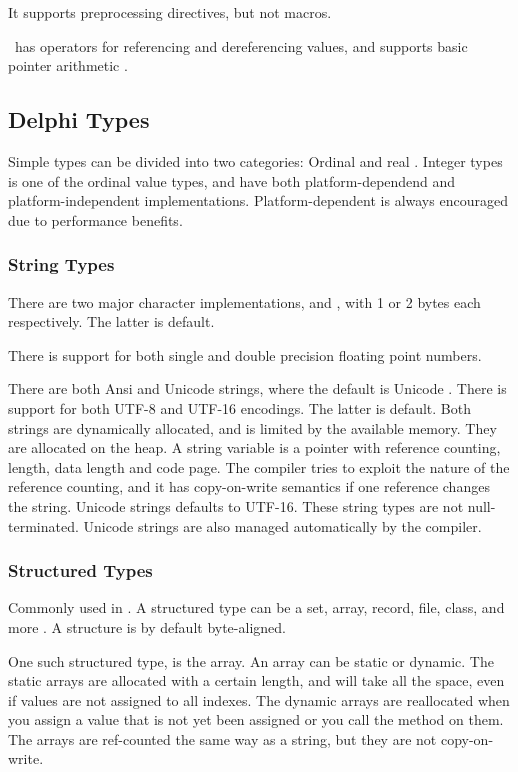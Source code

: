 It supports preprocessing directives, but not macros.

\delphi~has operators for referencing and dereferencing values, and supports basic pointer arithmetic \cite{noauthor_undated-cn}.

\subsection{Delphi Types}
\label{sub:Delphi Types}

Simple types can be divided into two categories: Ordinal and real \cite{noauthor_undated-st}. Integer types is one of the ordinal value types, and have both platform-dependend and platform-independent implementations. Platform-dependent is always encouraged due to performance benefits.

\subsubsection{String Types}
\label{ssub:String Types}
There are two major character implementations,  and , with 1 or 2 bytes each respectively. The latter is default.

There is support for both single and double precision floating point numbers.

There are both Ansi and Unicode strings, where the default is Unicode \cite{noauthor_undated-cp}. There is support for both UTF-8 and UTF-16 encodings. The latter is default. Both strings are dynamically allocated, and is limited by the available memory. They are allocated on the heap. A string variable is a pointer with reference counting, length, data length and code page. The compiler tries to exploit the nature of the reference counting, and it has copy-on-write semantics if one reference changes the string. Unicode strings defaults to UTF-16. These string types are not null-terminated. Unicode strings are also managed automatically by the compiler.

\subsubsection{Structured Types}
\label{ssub:Structured Types}
Commonly used in \delphi. A structured type can be a set, array, record, file, class, and more \cite{noauthor_undated-vu}. A structure is by default byte-aligned.

One such structured type, is the array. An array can be static or dynamic. The static arrays are allocated with a certain length, and will take all the space, even if values are not assigned to all indexes. The dynamic arrays are reallocated when you assign a value that is not yet been assigned or you call the  method on them. The arrays are ref-counted the same way as a string, but they are not copy-on-write.

